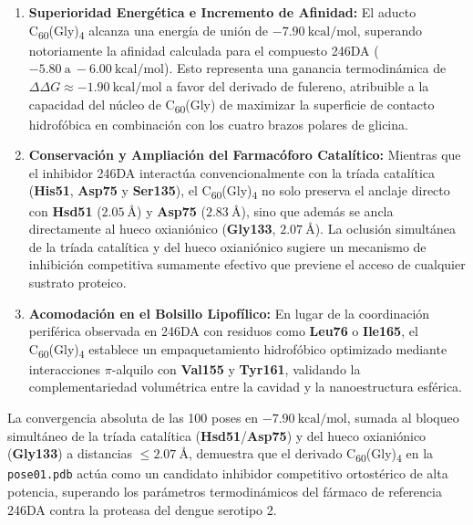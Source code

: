 \begin{enumerate}
    \item \textbf{Superioridad Energética e Incremento de Afinidad:} El aducto C\textsubscript{60}(Gly)\textsubscript{4} alcanza una energía de unión de $-7.90\ \text{kcal/mol}$, superando notoriamente la afinidad calculada para el compuesto 246DA ($-5.80\ \text{a}\ -6.00\ \text{kcal/mol}$). Esto representa una ganancia termodinámica de $\Delta\Delta G \approx -1.90\ \text{kcal/mol}$ a favor del derivado de fulereno, atribuible a la capacidad del núcleo de C\textsubscript{60}(Gly) de maximizar la superficie de contacto hidrofóbica en combinación con los cuatro brazos polares de glicina.
    
    \item \textbf{Conservación y Ampliación del Farmacóforo Catalítico:} Mientras que el inhibidor 246DA interactúa convencionalmente con la tríada catalítica (\textbf{His51}, \textbf{Asp75} y \textbf{Ser135}), el C\textsubscript{60}(Gly)\textsubscript{4} no solo preserva el anclaje directo con \textbf{Hsd51} ($2.05\ \text{\AA}$) y \textbf{Asp75} ($2.83\ \text{\AA}$), sino que además se ancla directamente al hueco oxianiónico (\textbf{Gly133}, $2.07\ \text{\AA}$). La oclusión simultánea de la tríada catalítica y del hueco oxianiónico sugiere un mecanismo de inhibición competitiva sumamente efectivo que previene el acceso de cualquier sustrato proteico.
    
    \item \textbf{Acomodación en el Bolsillo Lipofílico:} En lugar de la coordinación periférica observada en 246DA con residuos como \textbf{Leu76} o \textbf{Ile165}, el C\textsubscript{60}(Gly)\textsubscript{4} establece un empaquetamiento hidrofóbico optimizado mediante interacciones $\pi$-alquilo con \textbf{Val155} y \textbf{Tyr161}, validando la complementariedad volumétrica entre la cavidad y la nanoestructura esférica.
\end{enumerate}

La convergencia absoluta de las 100 poses en $-7.90\ \text{kcal/mol}$, sumada al bloqueo simultáneo de la tríada catalítica (\textbf{Hsd51}/\textbf{Asp75}) y del hueco oxianiónico (\textbf{Gly133}) a distancias $\le 2.07\ \text{\AA}$, demuestra que el derivado C\textsubscript{60}(Gly)\textsubscript{4} en la \texttt{pose01.pdb} actúa como un candidato inhibidor competitivo ortostérico de alta potencia, superando los parámetros termodinámicos del fármaco de referencia 246DA contra la proteasa del dengue serotipo 2.


